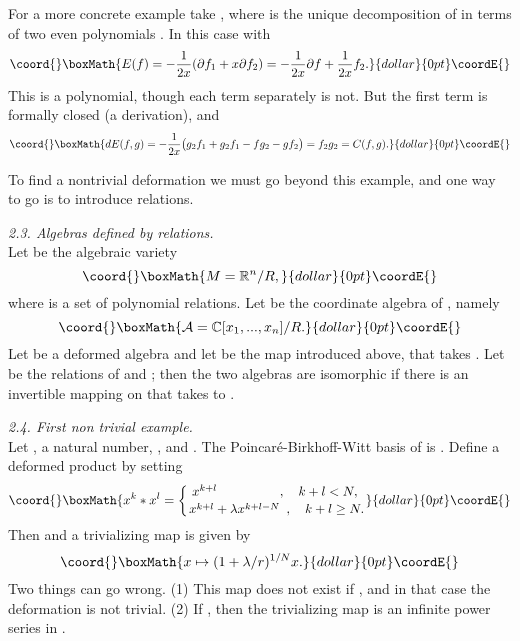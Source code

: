 \documentclass[a4paper,a4paper]{article}
\begin{document}
For a more concrete example take \coordHE{}, where 
\coordHE{} is the unique decomposition of \coordHE{} in terms of two even
polynomials \coordHE{}. In this case \coordHE{} with
$$\coord{}\boxMath{
E(f) = {-\frac{1}{2x}}(\partial f_1 + x\partial f_2) = 
{-\frac{1}{2x}}\partial f + {\frac{1}{2x}}f_2.
}{dollar}{0pt}\coordE{}$$ 
This is  a polynomial,  though each term separately is not.   But the
first term is formally closed (a derivation), and
$$\coord{}\boxMath{
dE(f,g)  = {-\frac{1}{2x}}\bigl(g_2f_1 + g_2f_1 - fg_2 - gf_2\bigr)
= f_2g_2  = C(f,g).
}{dollar}{0pt}\coordE{}$$ 

To find a nontrivial deformation we must go beyond 
this example, and one way to go is to introduce relations.

\smallskip

\noindent\textit{2.3. Algebras defined by relations.}\\
Let \coordHE{} be the algebraic variety
$$\coord{}\boxMath{
M = \mathbb{R}^n/R,
}{dollar}{0pt}\coordE{}$$
where \coordHE{} is a set of polynomial relations. Let \coordHE{}
be the coordinate algebra of \coordHE{}, namely
$$\coord{}\boxMath{
{\mathcal{A}} = \mathbb{C}[x_1,...,x_n]/R.
}{dollar}{0pt}\coordE{}$$ 
Let \coordHE{} be a deformed algebra and let 
\coordHE{} be the map introduced above,  
that takes \coordHE{}. Let \coordHE{} be the relations of 
\coordHE{} and \coordHE{}; then the two algebras 
are isomorphic if there is an invertible mapping  on \coordHE{} that 
takes \coordHE{} to \coordHE{}.

\smallskip

\noindent\textit{2.4. First non trivial example.} \\
Let \coordHE{}, \coordHE{} a natural number, \coordHE{}, and \coordHE{}.  
The Poincar\'e-Birkhoff-Witt basis of \coordHE{} is 
\coordHE{}. Define a deformed product by setting
$$\coord{}\boxMath{
x^k*x^l = \biggl\{{\hskip-0.1cm x^{k+l}  \hskip17mm , 
\,\,\,\,\,\,k+l <N,\atop
x^{k+l}+\lambda x^{k+l-N} \,\,\, , \,\,\,\,\,\, k+l \geq N.}
}{dollar}{0pt}\coordE{}$$
Then \coordHE{}
and a trivializing map is given by 
$$\coord{}\boxMath{
x \mapsto (1+\lambda/r)^{1/N}x.
}{dollar}{0pt}\coordE{}$$
Two things can go wrong. (1) This map does not exist if \coordHE{}, and in
that case the deformation is not trivial.  (2)  If \coordHE{}, then the
trivializing map is an infinite power series in \myHighlight{$\lambda$}\coordHE{}.  
 
\end{document}
